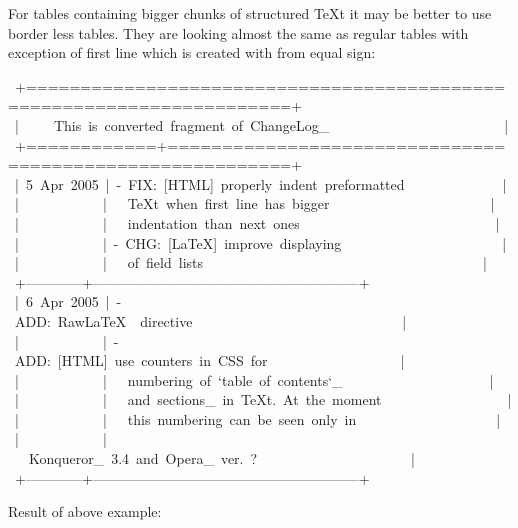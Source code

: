 \documentclass[12pt]{article}
\begin{document}
For tables containing bigger chunks of structured \TeX{}t it may be better
to use border less tables. They are looking almost the same as regular
tables with exception of first line which is created with from equal
sign:

\begin{ttfamily}\begin{flushleft}
\mbox{~+======================================================================+}\\
\mbox{~|~~~~~This~is~converted~fragment~of~ChangeLog\_~~~~~~~~~~~~~~~~~~~~~~~~~|}\\
\mbox{~+============+=========================================================+}\\
\mbox{~|~5~Apr~2005~|~-~FIX:~[HTML]~properly~indent~preformatted~~~~~~~~~~~~~~|}\\
\mbox{~|~~~~~~~~~~~~|~~~\TeX{}t~when~first~line~has~bigger~~~~~~~~~~~~~~~~~~~~~~~|}\\
\mbox{~|~~~~~~~~~~~~|~~~indentation~than~next~ones~~~~~~~~~~~~~~~~~~~~~~~~~~~~|}\\
\mbox{~|~~~~~~~~~~~~|~-~CHG:~[\LaTeX{}]~improve~displaying~~~~~~~~~~~~~~~~~~~~~~~|}\\
\mbox{~|~~~~~~~~~~~~|~~~of~field~lists~~~~~~~~~~~~~~~~~~~~~~~~~~~~~~~~~~~~~~~~|}\\
\mbox{~+------------+---------------------------------------------------------+}\\
\mbox{~|~6~Apr~2005~|~-~ADD:~Raw\LaTeX{}~~directive~~~~~~~~~~~~~~~~~~~~~~~~~~~~~~|}\\
\mbox{~|~~~~~~~~~~~~|~-~ADD:~[HTML]~use~counters~in~CSS~for~~~~~~~~~~~~~~~~~~~|}\\
\mbox{~|~~~~~~~~~~~~|~~~numbering~of~`table~of~contents`\_~~~~~~~~~~~~~~~~~~~~~|}\\
\mbox{~|~~~~~~~~~~~~|~~~and~sections\_~in~\TeX{}t.~At~the~moment~~~~~~~~~~~~~~~~~~|}\\
\mbox{~|~~~~~~~~~~~~|~~~this~numbering~can~be~seen~only~in~~~~~~~~~~~~~~~~~~~~|}\\
\mbox{~|~~~~~~~~~~~~|~~~Konqueror\_~3.4~and~Opera\_~ver.~?~~~~~~~~~~~~~~~~~~~~~~|}\\
\mbox{~+------------+---------------------------------------------------------+}\\
\end{flushleft}\end{ttfamily}

Result of above example:
\end{document}
